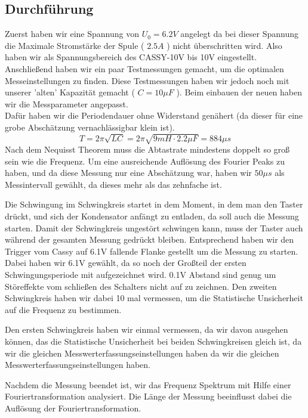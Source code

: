 \documentclass[twoside]{protokoll}
\begin{document}
\subsection{Durchführung}
Zuerst haben wir eine Spannung von $U_0 = 6.2V$ angelegt da bei dieser Spannung die Maximale Stromstärke der Spule ( $2.5A$ ) nicht überschritten wird.
Also haben wir als Spannungsbereich des CASSY-10V bis 10V eingestellt.
Anschließend haben wir ein paar Testmessungen gemacht, um die optimalen Messeinstellungen zu finden.
Diese Testmessungen haben wir jedoch noch mit unserer 'alten' Kapazität gemacht ( $C = 10 \mu F$ ).
Beim einbauen der neuen haben wir die Messparameter angepasst.\\
Dafür haben wir die Periodendauer ohne Widerstand genähert (da dieser für eine grobe Abschätzung vernachlässigbar klein ist).
\begin{equation}
    T = 2 \pi \sqrt{LC} = 2 \pi \sqrt{9mH \cdot 2.2 \mu F} = 884 \mu s
\end{equation}
Nach dem Nequisst Theorem muss die Abtastrate mindestens doppelt so groß sein wie die Frequenz.
Um eine ausreichende Auflösung des Fourier Peaks zu haben, und da diese Messung nur eine Abschätzung war, haben wir $ 50 \mu s $ als Messintervall gewählt, da dieses mehr als das zehnfache ist.

 
Die Schwingung im Schwingkreis startet in dem Moment, in dem man den Taster drückt, und sich der Kondensator anfängt zu entladen, da soll auch die Messung starten.
Damit der Schwingkreis ungestört schwingen kann, muss der Taster auch während der gesamten Messung gedrückt bleiben.
Entsprechend haben wir den Trigger vom Cassy auf 6.1V fallende Flanke gestellt um die Messung zu starten.
Dabei haben wir 6.1V gewählt, da so noch der Großteil der ersten Schwingungsperiode mit aufgezeichnet wird.
0.1V Abstand sind genug um Störeffekte vom schließen des Schalters nicht auf zu zeichnen.
Den zweiten Schwingkreis haben wir dabei 10 mal vermessen, um die Statistische Unsicherheit auf die Frequenz zu bestimmen.

Den ersten Schwingkreis haben wir einmal vermessen, da wir davon ausgehen können, das die Statistische Unsicherheit bei beiden Schwingkreisen gleich ist, da wir die gleichen Messwerterfassungseinstellungen haben da wir die gleichen Messwerterfassungseinstellungen haben.



Nachdem die Messung beendet ist, wir das Frequenz Spektrum mit Hilfe einer Fouriertransformation analysiert.
Die Länge der Messung beeinflusst dabei die Auflösung der Fouriertransformation.
 
\end{document}
